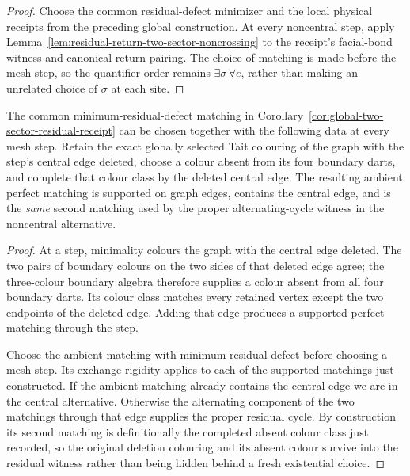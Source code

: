 \begin{proof}
Choose the common residual-defect minimizer and the local physical receipts
from the preceding global construction.  At every noncentral step, apply
Lemma~\ref{lem:residual-return-two-sector-noncrossing} to the receipt's
facial-bond witness and canonical return pairing.  The choice of matching is
made before the mesh step, so the quantifier order remains
\(\exists\sigma\,\forall e\), rather than making an unrelated choice of
\(\sigma\) at each site.
\end{proof}

\begin{corollary}
\label{cor:global-residual-pairing-provenance}
The common minimum-residual-defect matching in
Corollary~\ref{cor:global-two-sector-residual-receipt} can be chosen together
with the following data at every mesh step.  Retain the exact globally
selected Tait colouring of the graph with the step's central edge deleted,
choose a colour absent from its four boundary darts, and complete that colour
class by the deleted central edge.  The resulting ambient perfect matching is
supported on graph edges, contains the central edge, and is the \emph{same}
second matching used by the proper alternating-cycle witness in the
noncentral alternative.
\end{corollary}

\begin{proof}
At a step, minimality colours the graph with the central edge deleted.  The
two pairs of boundary colours on the two sides of that deleted edge agree;
the three-colour boundary algebra therefore supplies a colour absent from all
four boundary darts.  Its colour class matches every retained vertex except
the two endpoints of the deleted edge.  Adding that edge produces a supported
perfect matching through the step.

Choose the ambient matching with minimum residual defect before choosing a
mesh step.  Its exchange-rigidity applies to each of the supported matchings
just constructed.  If the ambient matching already contains the central edge
we are in the central alternative.  Otherwise the alternating component of
the two matchings through that edge supplies the proper residual cycle.  By
construction its second matching is definitionally the completed absent
colour class just recorded, so the original deletion colouring and its
absent colour survive into the residual witness rather than being hidden
behind a fresh existential choice.
\end{proof}

